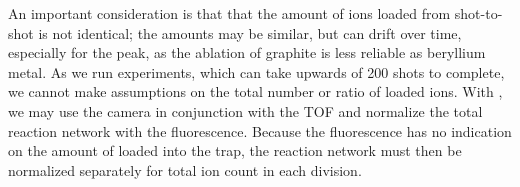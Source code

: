 An important consideration is that that the amount of ions loaded from shot-to-shot is not identical; the amounts may be similar, but can drift over time, especially for the  peak, as the ablation of graphite is less reliable as beryllium metal. As we run experiments, which can take upwards of 200 shots to complete, we cannot make assumptions on the total number or ratio of loaded ions. With , we may use the camera in conjunction with the TOF and normalize the total  reaction network with the fluorescence. Because the  fluorescence has no indication on the amount of  loaded into the trap, the  reaction network must then be normalized separately for total ion count in each division.